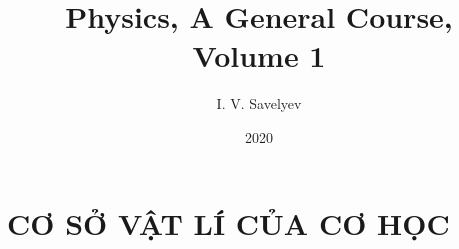 \documentclass[12pt, b5paper, twoside, fleqn]{book}
\title{Physics, A General Course, Volume 1}
\author{I. V. Savelyev}
\date{2020}
\numberwithin{equation}{section}
\begin{document}

\frontmatter


\cleardoublepage

\cleardoublepage

\cleardoublepage
{\hypersetup{linkcolor=black!80}
	\tableofcontents
}
\cleardoublepage

\mainmatter


\cleardoublepage

\part{CƠ SỞ VẬT LÍ CỦA CƠ HỌC}\label{part:A}
\cleardoublepage

% 
% 
% 
% 
% 
% 
% 
% 

% 
% 
% 
% 
% 
% 
% 

\printindex

\cleardoublepage

\end{document}
